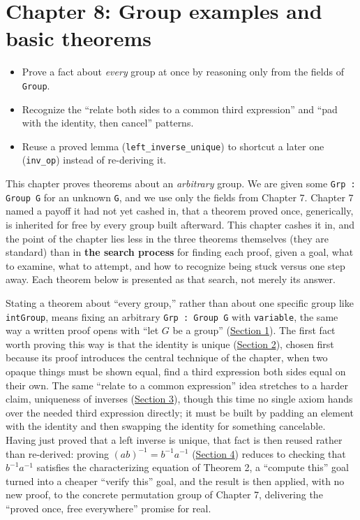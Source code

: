 \chapter{Chapter 8: Group examples and basic theorems}\label{sec:08-group-theorems:00-index:1}

\begin{learningobjectives}
\begin{itemize}
\tightlist
\item
  Prove a fact about \emph{every} group at once by reasoning only from the fields of \texttt{Group}.
\item
  Recognize the ``relate both sides to a common third expression'' and ``pad with the identity, then cancel'' patterns.
\item
  Reuse a proved lemma (\texttt{left\_\allowbreak{}inverse\_\allowbreak{}unique}) to shortcut a later one (\texttt{inv\_\allowbreak{}op}) instead of re-deriving it.
\end{itemize}
\end{learningobjectives}


This chapter proves theorems about an \emph{arbitrary} group. We are given some \texttt{Grp : Group G} for an unknown \texttt{G}, and we use only the fields from Chapter 7. Chapter 7 named a payoff it had not yet cashed in, that a theorem proved once, generically, is inherited for free by every group built afterward. This chapter cashes it in, and the point of the chapter lies less in the three theorems themselves (they are standard) than in \textbf{the search process} for finding each proof, given a goal, what to examine, what to attempt, and how to recognize being stuck versus one step away. Each theorem below is presented as that search, not merely its answer.

Stating a theorem about ``every group,'' rather than about one specific group like \texttt{intGroup}, means fixing an arbitrary \texttt{Grp : Group G} with \texttt{variable}, the same way a written proof opens with ``let \(G\) be a group'' (\hyperref[sec:08-group-theorems:01-setup:1]{Section 1}). The first fact worth proving this way is that the identity is unique (\hyperref[sec:08-group-theorems:02-theorem-1:1]{Section 2}), chosen first because its proof introduces the central technique of the chapter, when two opaque things must be shown equal, find a third expression both sides equal on their own. The same ``relate to a common expression'' idea stretches to a harder claim, uniqueness of inverses (\hyperref[sec:08-group-theorems:03-theorem-2:1]{Section 3}), though this time no single axiom hands over the needed third expression directly; it must be built by padding an element with the identity and then swapping the identity for something cancelable. Having just proved that a left inverse is unique, that fact is then reused rather than re-derived: proving \((ab)^{-1} = b^{-1}a^{-1}\) (\hyperref[sec:08-group-theorems:04-theorem-3:1]{Section 4}) reduces to checking that \(b^{-1}a^{-1}\) satisfies the characterizing equation of Theorem 2, a ``compute this'' goal turned into a cheaper ``verify this'' goal, and the result is then applied, with no new proof, to the concrete permutation group of Chapter 7, delivering the ``proved once, free everywhere'' promise for real.

